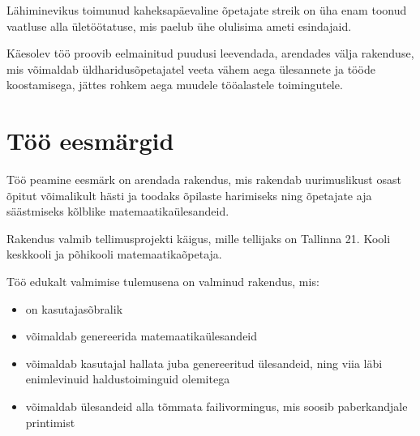 Lähiminevikus toimunud kaheksapäevaline õpetajate streik \cite{hm-opetajate-streik} on üha enam toonud vaatluse alla ületöötatuse, mis paelub ühe olulisima ameti esindajaid. 

Käesolev töö proovib eelmainitud puudusi leevendada, arendades välja rakenduse, mis võimaldab üldharidusõpetajatel veeta vähem aega ülesannete ja tööde koostamisega, jättes rohkem aega muudele tööalastele toimingutele.

\section{Töö eesmärgid}

Töö peamine eesmärk on arendada rakendus, mis rakendab uurimuslikust osast õpitut võimalikult hästi ja toodaks õpilaste harimiseks ning õpetajate aja säästmiseks kõlblike matemaatikaülesandeid.

Rakendus valmib tellimusprojekti käigus, mille tellijaks on Tallinna 21. Kooli keskkooli ja põhikooli matemaatikaõpetaja.

Töö edukalt valmimise tulemusena on valminud rakendus, mis:

\begin{itemize}
  \item on kasutajasõbralik
  \item võimaldab genereerida matemaatikaülesandeid
  \item võimaldab kasutajal hallata juba genereeritud ülesandeid, ning viia läbi enimlevinuid haldustoiminguid olemitega
  \item võimaldab ülesandeid alla tõmmata failivormingus, mis soosib paberkandjale printimist
\end{itemize}

